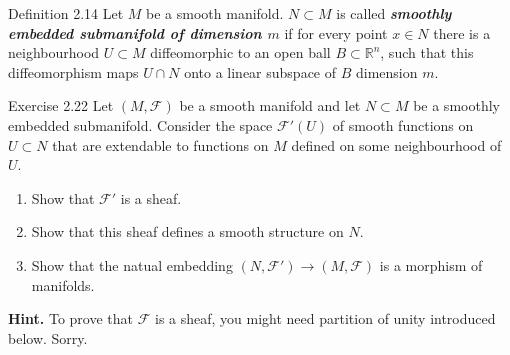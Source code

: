\begin{thing3}{Definition 2.14}\leavevmode
Let $M$ be a smooth manifold. $N \subset M$ is called \textit{\textbf{smoothly embedded submanifold of dimension $m$}} if for every point $x \in N$ there is a neighbourhood $U \subset M$ diffeomorphic to an open ball $B \subset \mathbb{R}^n$, such that this diffeomorphism maps $ U \cap N$ onto a linear subspace of $B$ dimension $m$.
\end{thing3}

\begin{thing4}{Exercise 2.22}\label{exer:2.22}\leavevmode
Let $(M,\mathcal{F})$ be a smooth manifold and let $N \subset M$ be a smoothly embedded submanifold. Consider the space $\mathcal{F}'(U)$ of smooth functions on $U \subset N$ that are extendable to functions on $M$ defined on some neighbourhood of $U$.
\begin{enumerate}[label=(\alph*)]
\item Show that $\mathcal{F}'$ is a sheaf.
\item  Show that this sheaf defines a smooth structure on $N$.
\item Show that the natual embedding $(N, \mathcal{F}') \to (M, \mathcal{F})$ is a morphism of manifolds.
\end{enumerate}
\textbf{Hint.} To prove that $\mathcal{F}$ is a sheaf, you might need partition of unity introduced below. Sorry.
\end{thing4}

